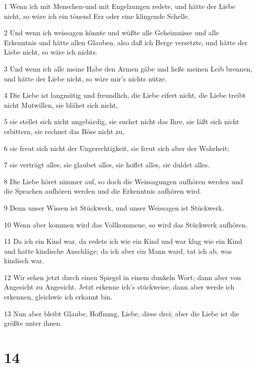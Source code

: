 \par 1 Wenn ich mit Menschen-und mit Engelzungen redete, und hätte der Liebe nicht, so wäre ich ein tönend Erz oder eine klingende Schelle.
\par 2 Und wenn ich weissagen könnte und wüßte alle Geheimnisse und alle Erkenntnis und hätte allen Glauben, also daß ich Berge versetzte, und hätte der Liebe nicht, so wäre ich nichts.
\par 3 Und wenn ich alle meine Habe den Armen gäbe und ließe meinen Leib brennen, und hätte der Liebe nicht, so wäre mir's nichts nütze.
\par 4 Die Liebe ist langmütig und freundlich, die Liebe eifert nicht, die Liebe treibt nicht Mutwillen, sie blähet sich nicht,
\par 5 sie stellet sich nicht ungebärdig, sie suchet nicht das Ihre, sie läßt sich nicht erbittern, sie rechnet das Böse nicht zu,
\par 6 sie freut sich nicht der Ungerechtigkeit, sie freut sich aber der Wahrheit;
\par 7 sie verträgt alles, sie glaubet alles, sie hoffet alles, sie duldet alles.
\par 8 Die Liebe höret nimmer auf, so doch die Weissagungen aufhören werden und die Sprachen aufhören werden und die Erkenntnis aufhören wird.
\par 9 Denn unser Wissen ist Stückwerk, und unser Weissagen ist Stückwerk.
\par 10 Wenn aber kommen wird das Vollkommene, so wird das Stückwerk aufhören.
\par 11 Da ich ein Kind war, da redete ich wie ein Kind und war klug wie ein Kind und hatte kindische Anschläge; da ich aber ein Mann ward, tat ich ab, was kindisch war.
\par 12 Wir sehen jetzt durch einen Spiegel in einem dunkeln Wort; dann aber von Angesicht zu Angesicht. Jetzt erkenne ich's stückweise; dann aber werde ich erkennen, gleichwie ich erkannt bin.
\par 13 Nun aber bleibt Glaube, Hoffnung, Liebe, diese drei; aber die Liebe ist die größte unter ihnen.

\chapter{14}

